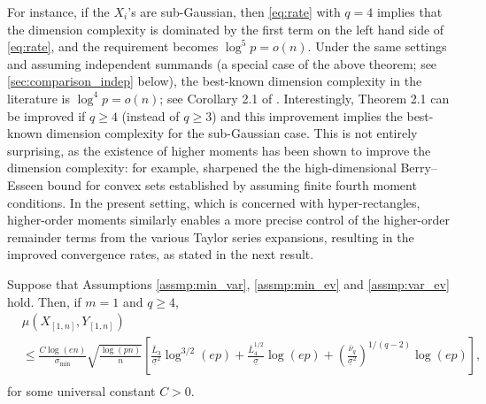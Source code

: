 \documentclass[aos]{imsart}
\begin{document}
For instance, if the $X_i$'s are sub-Gaussian, then  \cref{eq:rate} with $q=4$ implies that the dimension complexity is dominated by the first term on the left hand side of \eqref{eq:rate}, and the requirement becomes $\log^5 p = o(n)$.
%
%
%
%
%
%
Under the same settings and assuming independent summands (a special case of the above theorem; see  \cref{sec:comparison_indep} below), the best-known dimension complexity in the literature is $\log^4 p = o(n)$; see Corollary 2.1 of .
Interestingly, Theorem 2.1 can be improved if $q \ge 4$ (instead of $q \ge 3$) and this improvement implies the best-known dimension complexity for the sub-Gaussian case.
This is not entirely surprising, as the existence of higher moments has been shown to improve the dimension complexity: for example, \citet{fang2020large} sharpened the the high-dimensional Berry--Esseen bound for convex sets established by \citet{bentkus2005lyapunov}  assuming finite fourth moment conditions.
In the present setting, which is concerned with hyper-rectangles, higher-order moments similarly enables a more precise control of the higher-order remainder terms from the various Taylor series expansions, resulting in the improved convergence rates, as stated in the next result.

\begin{theorem} \label{thm:1_dep_berry_esseen_4P}
Suppose that Assumptions \eqref{assmp:min_var}, \eqref{assmp:min_ev} and \eqref{assmp:var_ev} hold. Then, 
if $m=1$ and $q \geq 4$,
\begin{equation*}
\begin{aligned}
    & \mu\left( X_{[1,n]}, Y_{[1,n]} \right) \\
    & \leq \frac{C \log\left(en\right)}{\sigma_{\min}} \sqrt{\frac{\log(pn)}{n}}  \left[
        \frac{\bar{L}_3}{\underline{\sigma}^2} \log^{3/2}(ep)
        + \frac{\bar{L}_4^{1/2}}{\underline{\sigma}} \log(ep)
        + \left( \frac{\bar\nu_q}{\underline\sigma^2} 
        \right)^{1/(q-2)} \log(ep) 
    \right], \\
\end{aligned}
\end{equation*}
for some universal constant $C > 0$.
\end{theorem}
\end{document}
